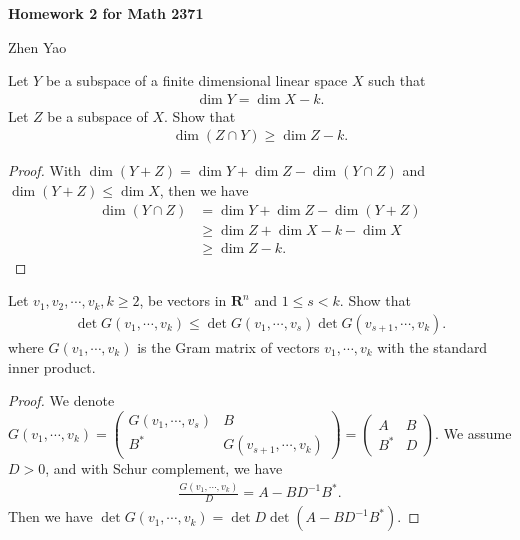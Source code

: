 \documentclass[12pt,leqno]{amsart}
\begin{document}
\centerline{\bf Homework 2 for Math 2371}
\centerline{Zhen Yao}

\medskip

 Let $Y$ be a subspace of a finite dimensional linear space $X$ such that 
\begin{align*}
    \dim Y = \dim X - k.
\end{align*}
Let $Z$ be a subspace of $X$. Show that 
\begin{align*}
    \dim (Z\cap Y) \geq \dim Z - k.
\end{align*}
\begin{proof}
With $\dim (Y+Z) = \dim Y + \dim Z - \dim (Y\cap Z)$ and $\dim(Y+Z) \leq \dim X$, then we have
\begin{align*}
    \dim (Y\cap Z) & = \dim Y + \dim Z - \dim (Y+Z) \\
    & \geq \dim Z + \dim X - k - \dim X \\
    & \geq \dim Z - k.
\end{align*}
\end{proof}

\medskip

 Let $v_1,v_2,\cdots, v_k, k\geq 2$, be vectors in $\mathbf{R}^n$ and $1\leq s < k$. Show that
\begin{align*}
    \det G(v_1,\cdots, v_k) \leq \det G(v_1,\cdots, v_s) \det G(v_{s+1},\cdots, v_k).
\end{align*}
where $G(v_1,\cdots, v_k)$ is the Gram matrix of vectors $v_1,\cdots, v_k$ with the standard inner product.
\begin{proof}
We denote 
$G(v_1,\cdots, v_k) = \begin{pmatrix}
    G(v_1,\cdots, v_s) & B \\
    B^* & G(v_{s+1},\cdots, v_k)
    \end{pmatrix} = \begin{pmatrix}
    A & B \\
    B^* & D
    \end{pmatrix}$. We assume $D > 0$, and
with Schur complement, we have
\begin{align*}
    \frac{G(v_1,\cdots, v_k)}{D} = A - B D^{-1} B^*.
\end{align*}
Then we have $\det G(v_1,\cdots, v_k) = \det D \det (A - B D^{-1} B^*)$.
\end{proof}

\medskip
\end{document}
